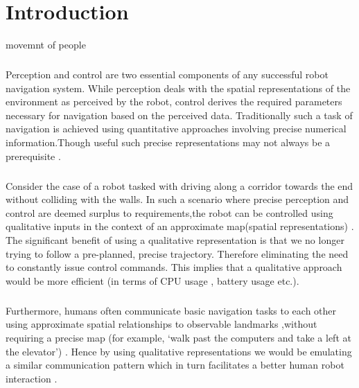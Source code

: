 
\chapter{Introduction}
\cite{lowe1975geography} movemnt of people
\paragraph{}  Perception and control are two essential components of any successful robot navigation system. While perception deals with the spatial representations of the environment as perceived by the robot, control derives the required parameters necessary for navigation based on the perceived data. Traditionally such a task of navigation is achieved using quantitative approaches involving precise numerical information.Though useful such precise representations may not always be a prerequisite \cite{blackwell1988spatial} \cite{shah2013qualitative}.
\paragraph{} Consider the case of a robot tasked with driving along a corridor towards the end without colliding with the walls. In such a scenario where precise perception and control are deemed surplus to requirements,the robot  can be controlled using qualitative inputs in the context of an approximate map(spatial representations) \cite{shah2013qualitative}. The significant benefit of using a qualitative representation is that we no longer trying to follow a pre-planned, precise trajectory. Therefore eliminating the need to constantly issue control commands. This implies that a qualitative approach would be more efficient \cite{chen2015survey} (in terms of CPU usage \cite{wakita1995intelligent}, battery usage etc.).
\paragraph{} Furthermore, humans often communicate basic navigation tasks to each other using approximate spatial relationships to observable landmarks \cite{michon2001and} \cite{chen2015survey} ,without requiring a precise map (for example, ‘walk past the computers and take a left at the elevator’) \cite{shah2013qualitative}. Hence by using qualitative representations we would be emulating a similar communication pattern which in turn facilitates a better human robot interaction \cite{dondrup2015computational}. 

